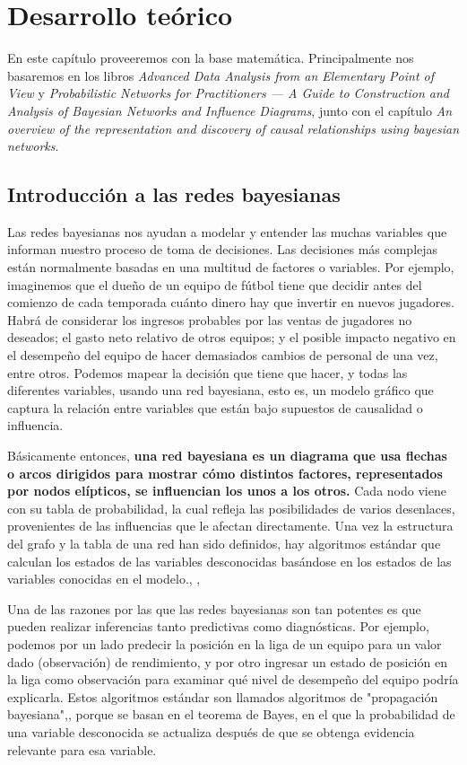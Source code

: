 \chapter{Desarrollo teórico}
En este capítulo proveeremos con la base matemática. Principalmente nos basaremos en los libros \textit{Advanced Data Analysis
from an Elementary Point of View}\cite{ada} y \textit{Probabilistic Networks for Practitioners — A
Guide to Construction and Analysis of Bayesian
Networks and Influence Diagrams}\cite{pgm}, junto con el capítulo \textit{An overview of the representation and 
discovery of causal relationships using bayesian networks}\cite{cooper}.

\section{Introducción a las redes bayesianas}
Las redes bayesianas nos ayudan a modelar y entender las muchas variables que informan nuestro proceso de 
toma de decisiones. Las decisiones más complejas están normalmente basadas en una multitud de factores o 
variables. Por ejemplo, imaginemos que el dueño de un equipo de fútbol tiene que decidir antes del comienzo 
de cada temporada cuánto dinero hay que invertir en nuevos jugadores. Habrá de considerar los ingresos 
probables por las ventas de jugadores no deseados; el gasto neto relativo de otros
equipos; y el posible impacto negativo en el desempeño del equipo de hacer demasiados cambios de personal de una 
vez, entre otros. Podemos mapear la decisión que tiene que hacer, y todas las diferentes variables, usando 
una red bayesiana, esto es, un modelo gráfico que captura la relación entre variables que están bajo 
supuestos de causalidad o influencia.\cite{things-to-know-BN}

Básicamente entonces, \textbf{una red bayesiana es un diagrama que 
usa flechas o arcos dirigidos para mostrar cómo distintos factores, representados por nodos elípticos, se 
influencian los unos a los otros.} Cada nodo viene con su tabla de probabilidad, la cual refleja las 
posibilidades de varios desenlaces, provenientes de las influencias que le afectan directamente. Una vez 
la estructura del grafo y la tabla de una red han sido definidos, hay algoritmos estándar que 
calculan los estados de las variables desconocidas basándose en los estados de las variables conocidas en el
modelo.\cite{learning-algorithms-BN-comparison}, \cite{BN-achilles-heel}, \cite{different-algorithmic-schemes}

Una de las razones por las que las redes bayesianas son tan potentes es que pueden realizar inferencias 
tanto predictivas como diagnósticas. Por ejemplo, podemos por un lado predecir la posición en la liga de un equipo para 
un valor dado (observación) de rendimiento, y por otro ingresar un estado de posición en la 
liga como observación para examinar qué nivel de desempeño del equipo podría explicarla. Estos algoritmos estándar son
llamados algoritmos de "propagación bayesiana"\cite{Cano2004},\cite{more-algorithms}, \cite{back-prop} porque se basan en el teorema de Bayes, en el que la 
probabilidad de una variable desconocida se actualiza después de que se obtenga evidencia relevante para esa variable.\cite{prop-alg}


